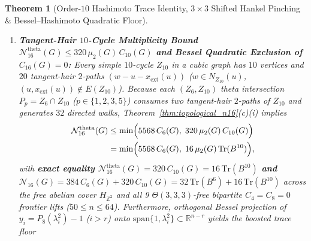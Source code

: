 \documentclass[10pt,a4paper]{article}
\newtheorem{theorem}{Theorem}[section]
\theoremstyle{definition}
\theoremstyle{remark}
\begin{document}
\begin{theorem}[Order-$10$ Hashimoto Trace Identity, $3 \times 3$ Shifted Hankel Pinching \& Bessel--Hashimoto Quadratic Floor]
\begin{enumerate}[label=(\alph*),nosep]
\begin{align}
    &\quad - 3\bigl((4 c_6^3 + 3 c_6^2 - 9 c_6 - 4) n - 3(31 c_6^2 + 3 c_6 - 84) r\bigr) \Bigr] \ge 0, \nonumber\\
    \det H_3\bigl((9 - x)\mu\bigr) &= 288\,n^3 \Bigl(5(c_6 - 2) c_{10} + 6 c_6^3 - 27 c_6^2 + 48\Bigr) \ge 0, \label{eq:hankel_b10}
  \end{align}
  pinching $c_{10}(G)$ inside
  \begin{equation}\label{eq:c10_pinch}
    \frac{3\bigl((4 c_6^3 + 3 c_6^2 - 9 c_6 - 4) n - 3(31 c_6^2 + 3 c_6 - 84) r\bigr)}{5\bigl((c_6 + 1) n - 3(c_6 + 5) r\bigr)} \;\le\; c_{10}(G) \;\le\; \frac{6 c_6^3 - 27 c_6^2 + 48}{5(2 - c_6)}.
  \end{equation}
  Setting $c_6 = 0$ gives $\frac{12(63 r - n)}{5(n - 15 r)} \le c_{10}(G) \le \frac{24}{5}$, which requires $n \ge 31 r$. At the $(3,10)$-Moore bound $n = 62, r = 2, c_6 = 0$, the lower and upper bounds collide at $c_{10} = \frac{24}{5}$, forcing $C_{10}(G) = \frac{1488}{5} = 297.6 \notin \mathbb{Z}$ ($\lceil 297.6 \rceil = 298 > 297 = \lfloor 297.6 \rfloor$); thus \textbf{no $(3,10)$-Moore graph on $n = 62$ vertices exists, and every bipartite cubic graph on $50 \le n \le 62$ with $C_4(G) = C_8(G) = 0$ satisfies $C_6(G) \ge 1$ ($g(G) = 6$)}.
  \item \textbf{Tangent-Hair $10$-Cycle Multiplicity Bound $\mathcal{N}_{16}^{\mathrm{theta}}(G) \le 320\,\mu_2(G)\,C_{10}(G)$ and Bessel Quadratic Exclusion of $C_{16}(G) = 0$:}
  Every simple $10$-cycle $Z_{10}$ in a cubic graph has $10$ vertices and $20$ tangent-hair $2$-paths $(w - u - x_{\mathrm{ext}}(u))$ ($w \in N_{Z_{10}}(u)$, $(u, x_{\mathrm{ext}}(u)) \notin E(Z_{10})$). Because each $(Z_6, Z_{10})$ theta intersection $P_p = Z_6 \cap Z_{10}$ ($p \in \{1, 2, 3, 5\}$) consumes two tangent-hair $2$-paths of $Z_{10}$ and generates $32$ directed walks, Theorem~\ref{thm:topological_n16}(c)(i) implies
  \begin{equation}\label{eq:theta_c10_bound}
  \begin{aligned}
    \mathcal{N}_{16}^{\mathrm{theta}}(G) &\le \min\Bigl(5568\,C_6(G),\; 320\,\mu_2(G)\,C_{10}(G)\Bigr) \\
    &= \min\Bigl(5568\,C_6(G),\; 16\,\mu_2(G)\,\mathrm{Tr}(B^{10})\Bigr),
  \end{aligned}
  \end{equation}
  with \textbf{exact equality $\mathcal{N}_{16}^{\mathrm{theta}}(G) = 320\,C_{10}(G) = 16\,\mathrm{Tr}(B^{10})$ and $\mathcal{N}_{16}(G) = 384\,C_6(G) + 320\,C_{10}(G) = 32\,\mathrm{Tr}(B^6) + 16\,\mathrm{Tr}(B^{10})$} across the free abelian cover $H_{\mathbb{Z}^2}$ and all 9 $\Theta(3,3,3)$-free bipartite $C_4 = C_8 = 0$ frontier lifts ($50 \le n \le 64$). Furthermore, orthogonal Bessel projection of $y_i = P_8(\lambda_i^2) - 1$ ($i > r$) onto $\mathrm{span}\{1, \lambda_i^2\} \subset \mathbb{R}^{n-r}$ yields the boosted trace floor

\end{enumerate}
\end{theorem}
\end{document}
